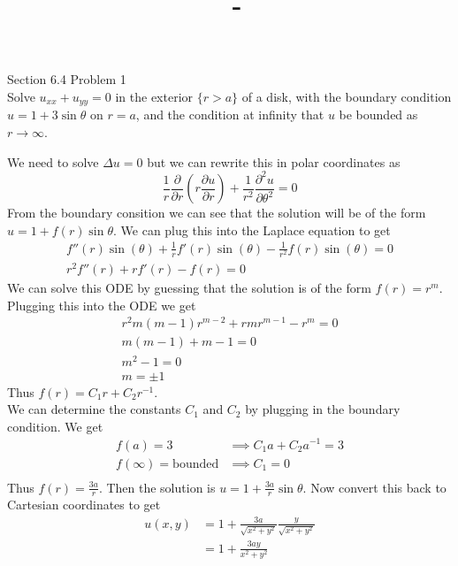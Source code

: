 \documentclass[answers,12pt,addpoints]{exam}
\author{\name}
\title{\course \ - \assignment}
\begin{document}
\maketitle


\newpage
\begin{questions}
    \question Section 6.4 Problem 1\\
    Solve \( u_{xx} + u_{yy} = 0 \) in the exterior \( \{ r > a \} \) of a disk, with the boundary condition \( u = 1 + 3\sin\theta \) on \( r = a \), and the condition at infinity that \( u \) be bounded as \( r \to \infty \).
    \begin{solution}
        We need to solve $\Delta u = 0$ but we can rewrite this in polar coordinates as
        \[ \frac{1}{r} \frac{\partial}{\partial r} \left( r \frac{\partial u}{\partial r} \right) + \frac{1}{r^2} \frac{\partial^2 u}{\partial \theta^2} = 0 \]
        From the boundary consition we can see that the solution will be of the form $u = 1 + f(r) \sin \theta$. We can plug this into the Laplace equation to get\\
        \begin{align*}
            f''(r) \sin(\theta) + \frac{1}{r} f'(r) \sin(\theta) - \frac{1}{r^2} f(r) \sin(\theta) = 0\\
            r^2 f''(r) + r f'(r) - f(r) = 0
        \end{align*}
        We can solve this ODE by guessing that the solution is of the form $f(r) = r^m$. Plugging this into the ODE we get
        \begin{align*}
            r^2 m(m-1) r^{m-2} + r m r^{m-1} - r^m = 0\\
            m(m-1) + m - 1 = 0\\
            m^2 - 1 = 0\\
            m = \pm 1
        \end{align*}
        Thus $f(r) = C_1 r + C_2 r^{-1}$. \\
        We can determine the constants $C_1$ and $C_2$ by plugging in the boundary condition. We get
        \begin{align*}
            f(a) = 3 &\implies C_1 a + C_2 a^{-1} = 3\\
            f(\infty) = \text{bounded} &\implies C_1 = 0 \\
        \end{align*}
        Thus $f(r) = \frac{3a}{r}$. Then the solution is $u = 1 + \frac{3a}{r} \sin \theta$.
        Now convert this back to Cartesian coordinates to get
        \begin{align*}
            u(x,y) &= 1 + \frac{3a}{\sqrt{x^2 + y^2}} \frac{y}{\sqrt{x^2 + y^2}}\\
            &= 1 + \frac{3ay}{x^2 + y^2}
        \end{align*}
    \end{solution}


\end{questions}
\end{document}
